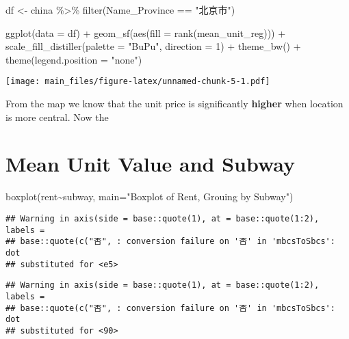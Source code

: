 \documentclass[
]{article}
\newenvironment{Shaded}{\begin{snugshade}}{\end{snugshade}}
\newcommand{\AttributeTok}[1]{\textcolor[rgb]{0.77,0.63,0.00}{#1}}
\newcommand{\DecValTok}[1]{\textcolor[rgb]{0.00,0.00,0.81}{#1}}
\newcommand{\FunctionTok}[1]{\textcolor[rgb]{0.00,0.00,0.00}{#1}}
\newcommand{\NormalTok}[1]{#1}
\newcommand{\OtherTok}[1]{\textcolor[rgb]{0.56,0.35,0.01}{#1}}
\newcommand{\SpecialCharTok}[1]{\textcolor[rgb]{0.00,0.00,0.00}{#1}}
\newcommand{\StringTok}[1]{\textcolor[rgb]{0.31,0.60,0.02}{#1}}
\begin{document}
\begin{Shaded}
\begin{Highlighting}[]
\NormalTok{df }\OtherTok{\textless{}{-}}\NormalTok{ china }\SpecialCharTok{\%\textgreater{}\%}
        \FunctionTok{filter}\NormalTok{(Name\_Province }\SpecialCharTok{==} \StringTok{"北京市"}\NormalTok{)}

\FunctionTok{ggplot}\NormalTok{(}\AttributeTok{data =}\NormalTok{ df) }\SpecialCharTok{+}
        \FunctionTok{geom\_sf}\NormalTok{(}\FunctionTok{aes}\NormalTok{(}\AttributeTok{fill =} \FunctionTok{rank}\NormalTok{(mean\_unit\_reg))) }\SpecialCharTok{+}
        \FunctionTok{scale\_fill\_distiller}\NormalTok{(}\AttributeTok{palette =} \StringTok{"BuPu"}\NormalTok{, }\AttributeTok{direction =} \DecValTok{1}\NormalTok{) }\SpecialCharTok{+}
        \FunctionTok{theme\_bw}\NormalTok{() }\SpecialCharTok{+}
        \FunctionTok{theme}\NormalTok{(}\AttributeTok{legend.position =} \StringTok{"none"}\NormalTok{)}
\end{Highlighting}
\end{Shaded}

\texttt{[image: main\_files/figure-latex/unnamed-chunk-5-1.pdf]}

From the map we know that the unit price is significantly
\textbf{higher} when location is more central. Now the

\hypertarget{mean-unit-value-and-subway}{%
\section{Mean Unit Value and Subway}\label{mean-unit-value-and-subway}}

\begin{Shaded}
\begin{Highlighting}[]
\FunctionTok{boxplot}\NormalTok{(rent}\SpecialCharTok{\textasciitilde{}}\NormalTok{subway, }\AttributeTok{main=}\StringTok{"Boxplot of Rent, Grouing by Subway"}\NormalTok{)}
\end{Highlighting}
\end{Shaded}

\begin{verbatim}
## Warning in axis(side = base::quote(1), at = base::quote(1:2), labels =
## base::quote(c("否", : conversion failure on '否' in 'mbcsToSbcs': dot
## substituted for <e5>
\end{verbatim}

\begin{verbatim}
## Warning in axis(side = base::quote(1), at = base::quote(1:2), labels =
## base::quote(c("否", : conversion failure on '否' in 'mbcsToSbcs': dot
## substituted for <90>
\end{verbatim}
\end{document}
